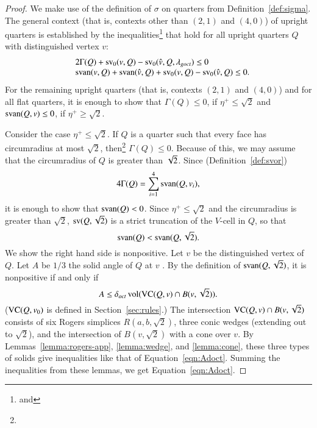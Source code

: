 \begin{proof}  
We make use
of the definition of $\sigma$ on quarters from
Definition~\ref{def:sigma}. The general context (that is, contexts
other than $(2,1)$ and $(4,0)$) of upright quarters is established
by the inequalities\footnote{ and
} that hold for all upright quarters $Q$ with
distinguished vertex $v$:
    $$
    \begin{array}{lll}
    &2\Gamma(Q) + {\operatorname{sv}}_0(v,Q) - {\operatorname{sv}}_0(\hat v,Q,\lambda_{goct}) \le 0\\
    &{\operatorname{svan}}(v,Q) + {\operatorname{svan}}(\hat v,Q) 
  +{\operatorname{sv}}_0(v,Q) - {\operatorname{sv}}_0(\hat v,Q)\le0.
    \end{array}
    $$
For the remaining upright quarters (that is, contexts $(2,1)$ and $(4,0)$)
and for all flat quarters,
it is enough to show that $\Gamma(Q)\le0$, if $\eta^+\le\sqrt2$ and
${\operatorname{svan}}(Q,v)\le0$, if $\eta^+\ge\sqrt2$.

Consider the case $\eta^+\le\sqrt2$.  If $Q$ is a quarter such that
every face has circumradius at most $\sqrt2$,
then\footnote{} $\Gamma(Q)\le0$.  
Because of this, we may assume that the circumradius of $Q$ is
greater than $\sqrt2$. 
Since
(Definition~\ref{def:svor})
    $$4\Gamma(Q)=\sum_{i=1}^4 {\operatorname{svan}}(Q,v_i),$$
it is enough to show that ${\operatorname{svan}}(Q)<0$.  Since $\eta^+\le\sqrt2$ 
and the circumradius is greater than
$\sqrt2$, ${\operatorname{sv}}(Q,\sqrt2)$ is a strict truncation of the $V$-cell
in $Q$, so that
    $${\operatorname{svan}}(Q)<{\operatorname{svan}}(Q,\sqrt2).$$
We show the right hand side is nonpositive.  Let $v$ be the
distinguished vertex of $Q$.  Let $A$ be $1/3$ the solid angle of
$Q$ at $v$ . By the definition of ${\operatorname{svan}}(Q,\sqrt2)$, it is
nonpositive if and only if
    \begin{equation}
        A\le \delta_{oct} \,{\operatorname{vol}}({\operatorname{VC}}(Q,v)\cap B(v,\sqrt2)).
        \label{eqn:Adoct}
    \end{equation}
(${\operatorname{VC}}(Q,v_0)$ is defined in Section~\ref{sec:rules}.) The
intersection ${\operatorname{VC}}(Q,v)\cap B(v,\sqrt2)$ consists of six Rogers
simplices $R(a,b,\sqrt2)$, three conic wedges (extending out to
$\sqrt2$), and the intersection of $B(v,\sqrt2)$ with a cone over
$v$. By Lemmas~\ref{lemma:rogers-app}, \ref{lemma:wedge}, and
\ref{lemma:cone}, these three types of solids give inequalities like
that of Equation~\ref{eqn:Adoct}. Summing the inequalities from
these lemmas, we get Equation~\ref{eqn:Adoct}.


\end{proof}
